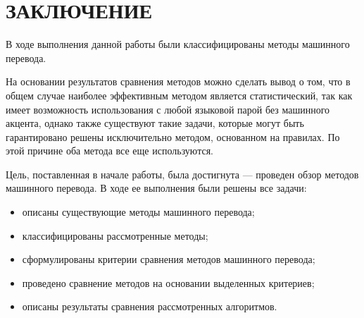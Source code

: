 \chapter*{ЗАКЛЮЧЕНИЕ}

В ходе выполнения данной работы были классифицированы методы машинного перевода. 

На основании результатов сравнения методов можно сделать вывод о том, что в общем случае наиболее эффективным методом является статистический, так как имеет возможность использования с любой языковой парой без машинного акцента, однако также существуют такие задачи, которые могут быть гарантировано решены исключительно методом, основанном на правилах. По этой причине оба метода все еще используются.

Цель, поставленная в начале работы, была достигнута --- проведен обзор методов машинного перевода. 
В ходе ее выполнения были решены все задачи:

\begin{itemize}[label=---]
	\item описаны существующие методы машинного перевода;
    \item классифицированы рассмотренные методы;
    \item сформулированы критерии сравнения методов машинного перевода;
	\item проведено сравнение методов на основании выделенных критериев;
	\item описаны результаты сравнения рассмотренных алгоритмов.
\end{itemize}
